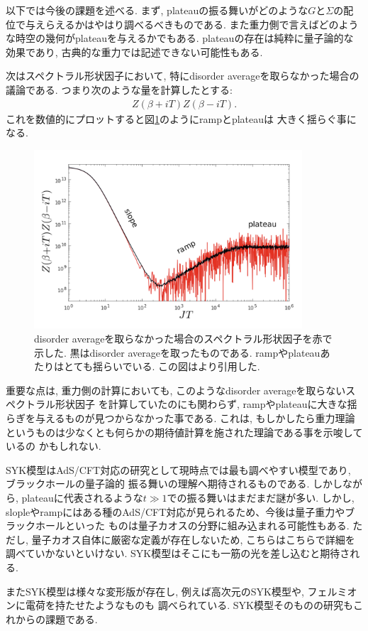 以下では今後の課題を述べる. 
まず, plateauの振る舞いがどのような$G$と$\Sigma$の配位で与えらえるかはやはり調べるべきものである. 
また重力側で言えばどのような時空の幾何がplateauを与えるかでもある. 
plateauの存在は純粋に量子論的な効果であり, 古典的な重力では記述できない可能性もある. 

次はスペクトラル形状因子において, 特にdisorder averageを取らなかった場合の議論である. 
つまり次のような量を計算したとする:
\begin{align}
	Z(\beta + iT)Z(\beta - iT).
\end{align}
これを数値的にプロットすると図\ref{fig:non_disorder_averaged_g}のようにrampとplateauは
大きく揺らぐ事になる. 
\begin{figure}[ht]
	\centering
	\includegraphics[width=10cm]{figures/non_disorder_averaged_g}
	\caption{disorder averageを取らなかった場合のスペクトラル形状因子を赤で示した. 
	黒はdisorder averageを取ったものである. 
	rampやplateauあたりはとても揺らいでいる. この図は\cite{stanford_chaos}より引用した. }
	\label{fig:non_disorder_averaged_g}
\end{figure}

重要な点は, 重力側の計算においても, このようなdisorder averageを取らないスペクトラル形状因子
を計算していたのにも関わらず, rampやplateauに大きな揺らぎを与えるものが見つからなかった事である. 
これは, もしかしたら重力理論というものは少なくとも何らかの期待値計算を施された理論である事を示唆しているの
かもしれない\cite{stanford_chaos}. 

SYK模型はAdS/CFT対応の研究として現時点では最も調べやすい模型であり, ブラックホールの量子論的
振る舞いの理解へ期待されるものである. 
しかしながら, plateauに代表されるような$t \gg 1$での振る舞いはまだまだ謎が多い. 
しかし, slopleやrampにはある種のAdS/CFT対応が見られるため、今後は量子重力やブラックホールといった
ものは量子カオスの分野に組み込まれる可能性もある.
ただし, 量子カオス自体に厳密な定義が存在しないため, こちらはこちらで詳細を調べていかないといけない.
SYK模型はそこにも一筋の光を差し込むと期待される.

またSYK模型は様々な変形版が存在し, 例えば高次元のSYK模型や, フェルミオンに電荷を持たせたようなものも
調べられている\cite{gaikwad}\cite{berkooz}. 
SYK模型そのものの研究もこれからの課題である. 

\pagebreak
